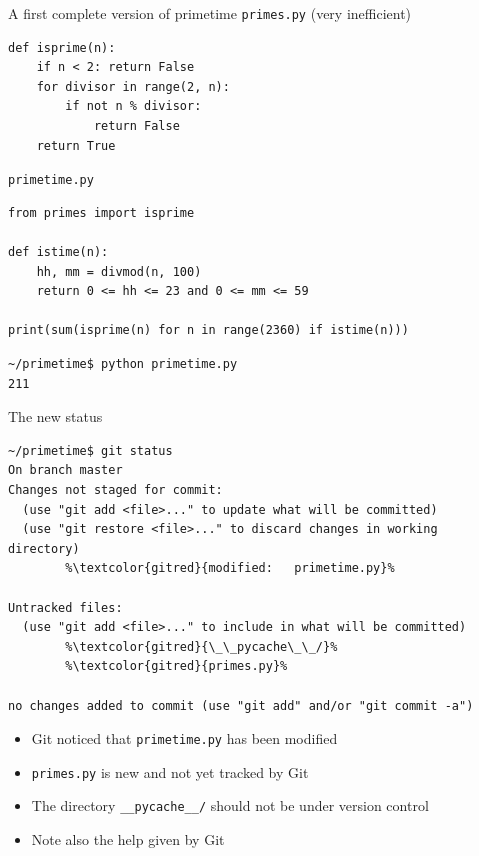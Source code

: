 \documentclass[svgnames]{beamer}
\begin{document}
\begin{frame}[fragile]{A first complete version of primetime}
 \texttt{primes.py} (very inefficient)
 \begin{lstlisting}
def isprime(n):
    if n < 2: return False
    for divisor in range(2, n):
        if not n % divisor:
            return False
    return True
 \end{lstlisting}

 \vspace{0.2truecm}
 \texttt{primetime.py}
 \begin{lstlisting}
from primes import isprime

def istime(n):
    hh, mm = divmod(n, 100)
    return 0 <= hh <= 23 and 0 <= mm <= 59

print(sum(isprime(n) for n in range(2360) if istime(n)))
 \end{lstlisting}

 \vspace{0.4truecm}
 \begin{lstlisting}
~/primetime$ python primetime.py
211 
 \end{lstlisting}
\end{frame}

\begin{frame}[fragile]{The new status}
 \addtolength\linewidth{0.5truecm}
 \begin{lstlisting}[breaklines=true, escapechar=\%]
~/primetime$ git status
On branch master
Changes not staged for commit:
  (use "git add <file>..." to update what will be committed)
  (use "git restore <file>..." to discard changes in working directory)
        %\textcolor{gitred}{modified:   primetime.py}%

Untracked files:
  (use "git add <file>..." to include in what will be committed)
        %\textcolor{gitred}{\_\_pycache\_\_/}%
        %\textcolor{gitred}{primes.py}%

no changes added to commit (use "git add" and/or "git commit -a")
 \end{lstlisting}
 \begin{itemize}
  \item Git noticed that \texttt{primetime.py} has been modified
  \item \texttt{primes.py} is new and not yet tracked by Git
  \item The directory \texttt{\_\_pycache\_\_/} should not be under version control
  \item Note also the help given by Git
 \end{itemize}
\end{frame}
\end{document}
